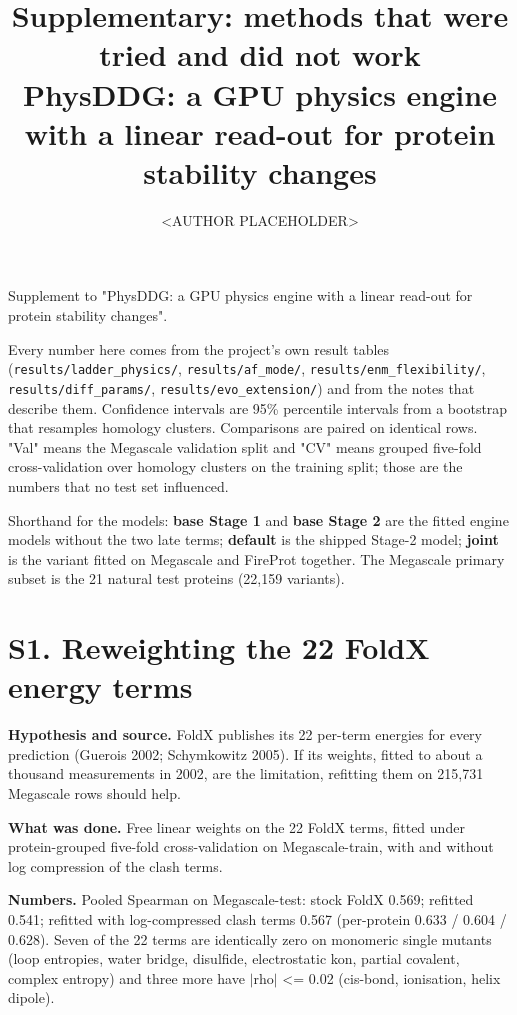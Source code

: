 \documentclass[11pt,a4paper]{article}
\title{Supplementary: methods that were tried and did not work\\[2mm]
\large PhysDDG: a GPU physics engine with a linear read-out for protein stability changes}
\author{<AUTHOR PLACEHOLDER>}
\date{}
\begin{document}
\maketitle
\sloppy


Supplement to "PhysDDG: a GPU physics engine with a linear read-out for protein stability changes".

Every number here comes from the project's own result tables (\texttt{results/ladder\_physics/},
\texttt{results/af\_mode/}, \texttt{results/enm\_flexibility/}, \texttt{results/diff\_params/}, \texttt{results/evo\_extension/}) and from the
notes that describe them. Confidence intervals are 95\% percentile intervals from a bootstrap that resamples
homology clusters. Comparisons are paired on identical rows. "Val" means the Megascale validation split and
"CV" means grouped five-fold cross-validation over homology clusters on the training split; those are the
numbers that no test set influenced.

Shorthand for the models: \textbf{base Stage 1} and \textbf{base Stage 2} are the fitted engine models without the two
late terms; \textbf{default} is the shipped Stage-2 model; \textbf{joint} is the variant fitted on Megascale and FireProt
together. The Megascale primary subset is the 21 natural test proteins (22,159 variants).



\section{S1. Reweighting the 22 FoldX energy terms}

\textbf{Hypothesis and source.} FoldX publishes its 22 per-term energies for every prediction
(Guerois 2002; Schymkowitz 2005). If its weights, fitted to about a thousand measurements in 2002, are the
limitation, refitting them on 215,731 Megascale rows should help.

\textbf{What was done.} Free linear weights on the 22 FoldX terms, fitted under protein-grouped five-fold
cross-validation on Megascale-train, with and without log compression of the clash terms.

\textbf{Numbers.} Pooled Spearman on Megascale-test: stock FoldX 0.569; refitted 0.541; refitted with
log-compressed clash terms 0.567 (per-protein 0.633 / 0.604 / 0.628). Seven of the 22 terms are identically
zero on monomeric single mutants (loop entropies, water bridge, disulfide, electrostatic kon, partial covalent,
complex entropy) and three more have $|$rho$|$ <= 0.02 (cis-bond, ionisation, helix dipole).
\end{document}
